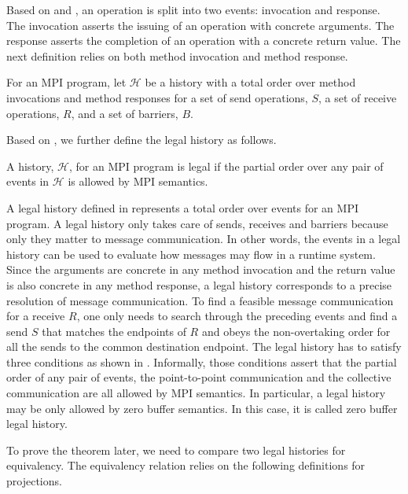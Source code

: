 Based on  and , an operation is split into two events: invocation and response. The invocation asserts the issuing of an operation with concrete arguments. The response asserts the completion of an operation with a concrete return value. The next definition relies on both method invocation and method response. 

\begin{definition}[History]\label{def:history}
For an MPI program, let $\mathcal{H}$ be a history with a total order over method invocations and method responses for a set of send operations, $S$, a set of receive operations, $R$, and a set of barriers, $B$.
\end{definition}

Based on , we further define the legal history as follows.

\begin{definition}\label{def:legal}
A history, $\mathcal{H}$, for an MPI program is legal if the partial order over any pair of events in $\mathcal{H}$ is allowed by MPI semantics.
\end{definition}

A legal history defined in  represents a total order over events for an MPI program. A legal history only takes care of sends, receives and barriers because only they matter to message communication. In other words, the events in a legal history can be used to evaluate how messages may flow in a runtime system. Since the arguments are concrete in any method invocation and the return value is also concrete in any method response, a legal history corresponds to a precise resolution of message communication. To find a feasible message communication for a receive $R$, one only needs to search through the preceding events and find a send $S$ that matches the endpoints of $R$ and obeys the non-overtaking order for all the sends to the common destination endpoint. The legal history has to satisfy three conditions as shown in . Informally, those conditions assert that the partial order of any pair of events, the point-to-point communication and the collective communication are all allowed by MPI semantics. In particular, a legal history may be only allowed by zero buffer semantics. In this case, it is called zero buffer legal history.

To prove the theorem later, we need to compare two legal histories for equivalency. The equivalency relation relies on the following definitions for projections. 

